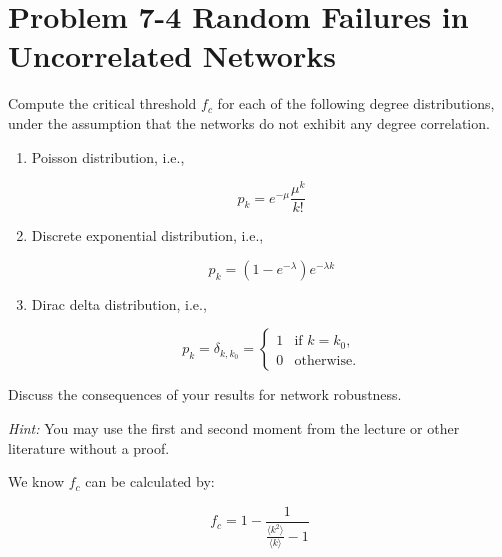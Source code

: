 \section{Problem 7-4 Random Failures in Uncorrelated Networks}

Compute the critical threshold $f_c$ for each of the following degree distributions, under the assumption that the
networks do not exhibit any degree correlation.

\begin{enumerate}
	\item Poisson distribution, i.e.,
	
	\begin{equation*}
		p_k = e^{-\mu}\frac{\mu^k}{k!}
	\end{equation*}

	\item Discrete exponential distribution, i.e.,
	
	\begin{equation*}
		p_k = (1 - e^{-\lambda})e^{-\lambda k}
	\end{equation*}

	\item Dirac delta distribution, i.e.,
	
	\begin{equation*}
		p_k = \delta_{k,k_0} = 
		\begin{cases}
			1 & \text{if $k = k_0$,} \\
			0 & \text{otherwise.}
		\end{cases}
	\end{equation*}
\end{enumerate}

\noindent
Discuss the consequences of your results for network robustness.

\noindent
\textit{Hint:} You may use the first and second moment from the lecture or other literature without a proof. \newline

\noindent
We know $f_c$ can be calculated by:

\begin{equation*}
	f_c = 1 - \frac{1}{\frac{\langle k^2 \rangle}{\langle k \rangle} - 1}
\end{equation*}

